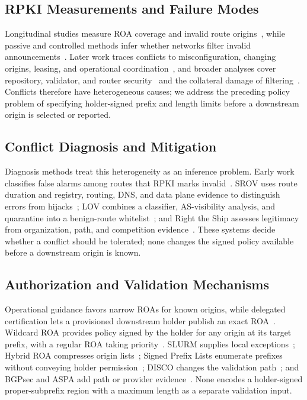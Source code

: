 \label{sec:related_work}

\subsection{RPKI Measurements and Failure Modes}

Longitudinal studies measure ROA coverage and invalid route origins~\cite{chung2019}, while passive and controlled methods infer whether networks filter invalid announcements~\cite{gilad2017rpki,hlavacek2023}. Later work traces conflicts to misconfiguration, changing origins, leasing, and operational coordination~\cite{demystifying2026,leasing2026}, and broader analyses cover repository, validator, and router security~\cite{sok2025} and the collateral damage of filtering~\cite{improv2025}. Conflicts therefore have heterogeneous causes; we address the preceding policy problem of specifying holder-signed prefix and length limits before a downstream origin is selected or reported.

\subsection{Conflict Diagnosis and Mitigation}

Diagnosis methods treat this heterogeneity as an inference problem. Early work classifies false alarms among routes that RPKI marks invalid~\cite{xu2019falsealarm}. SROV uses route duration and registry, routing, DNS, and data plane evidence to distinguish errors from hijacks~\cite{srov2022}; LOV combines a classifier, AS-visibility analysis, and quarantine into a benign-route whitelist~\cite{schulmann2025learning}; and Right the Ship assesses legitimacy from organization, path, and competition evidence~\cite{righttheship2025}. These systems decide whether a conflict should be tolerated; none changes the signed policy available before a downstream origin is known.

\subsection{Authorization and Validation Mechanisms}

Operational guidance favors narrow ROAs for known origins, while delegated certification lets a provisioned downstream holder publish an exact ROA~\cite{rfc7115,rfc9319,rfc6480,rfc6487,rfc9582}. Wildcard ROA provides policy signed by the holder for any origin at its target prefix, with a regular ROA taking priority~\cite{gilad2017rpki}. SLURM supplies local exceptions~\cite{rfc8416}; Hybrid ROA compresses origin lists~\cite{hybridroa2024}; Signed Prefix Lists enumerate prefixes without conveying holder permission~\cite{rpki-spl2025}; DISCO changes the validation path~\cite{disco2020}; and BGPsec and ASPA add path or provider evidence~\cite{rfc8205,aspa-profile2026}. None encodes a holder-signed proper-subprefix region with a maximum length as a separate validation input.
